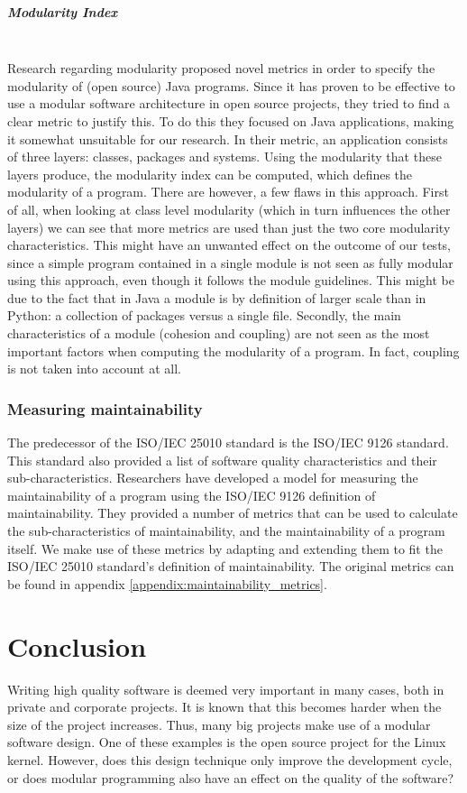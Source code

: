 \documentclass[twoside]{uva-inf-bachelor-thesis}
\newcommand{\myparagraph}[1]{\paragraph{#1}\mbox{}\\}
\begin{document}
\myparagraph{Modularity Index}
Research regarding modularity proposed novel metrics in order to specify the modularity of (open source) Java programs\cite{emanuel2013modularity}. Since it has proven to be effective to use a modular software architecture in open source projects\cite{lee2000linux}, they tried to find a clear metric to justify this. To do this they focused on Java applications, making it somewhat unsuitable for our research. In their metric, an application consists of three layers: classes, packages and systems. Using the modularity that these layers produce, the modularity index can be computed, which defines the modularity of a program. There are however, a few flaws in this approach. First of all, when looking at class level modularity (which in turn influences the other layers) we can see that more metrics are used than just the two core modularity characteristics. This might have an unwanted effect on the outcome of our tests, since a simple program contained in a single module is not seen as fully modular using this approach, even though it follows the module guidelines. This might be due to the fact that in Java a module is by definition of larger scale than in Python: a collection of packages versus a single file. Secondly, the main characteristics of a module (cohesion and coupling) are not seen as the most important factors when computing the modularity of a program. In fact, coupling is not taken into account at all.

\subsection*{Measuring maintainability}
The predecessor of the ISO/IEC 25010 standard is the ISO/IEC 9126 standard\cite{ISO9126}. This standard also provided a list of software quality characteristics and their sub-characteristics. Researchers have developed a model for measuring the maintainability of a program using the ISO/IEC 9126 definition of maintainability\cite{heitlager2016practical}. They provided a number of metrics that can be used to calculate the sub-characteristics of maintainability, and the maintainability of a program itself. We make use of these metrics by adapting and extending them to fit the ISO/IEC 25010 standard's definition of maintainability. The original metrics can be found in appendix \ref{appendix:maintainability_metrics}.

\chapter{Conclusion}
Writing high quality software is deemed very important in many cases, both in private and corporate projects. It is known that this becomes harder when the size of the project increases\cite{bhatia2014survey,banker1993software}. Thus, many big projects make use of a modular software design. One of these examples is the open source project for the Linux kernel\cite{lee2000linux}. However, does this design technique only improve the development cycle, or does modular programming also have an effect on the quality of the software?\\
\end{document}
